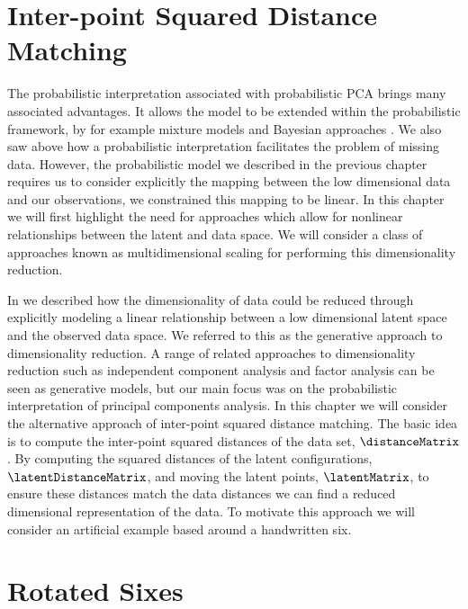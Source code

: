 \section{Inter-point Squared Distance Matching}

The probabilistic interpretation associated with probabilistic
PCA brings many associated
advantages. It allows the model to be extended within the
probabilistic framework, by for example mixture models
\citep{Tipping:iee_mixpca97,Ghahramani:emmixtures97} and Bayesian approaches
\citep{Bishop:bayesPCA98,Bishop:icann99,Minka:automatic01}. We also saw above how a probabilistic interpretation
facilitates the problem of missing data. However, the probabilistic
model we described in the previous chapter requires us to consider
explicitly the mapping between the low dimensional data and our
observations, we constrained this mapping to be linear. In this
chapter we will first highlight the need for approaches which allow
for nonlinear relationships between the latent and data space. We will
consider a class of approaches known as multidimensional
scaling for performing this
dimensionality reduction.

In  we described how the dimensionality of data
could be reduced through explicitly modeling a linear relationship
between a low dimensional latent space and the observed data space. We
referred to this as the generative approach to dimensionality
reduction. A range of related approaches to dimensionality reduction
such as independent component analysis and factor analysis can
be seen as generative models, but our main focus was on the
probabilistic interpretation of principal components
analysis. In this chapter we will
consider the alternative approach of inter-point squared distance
matching. The basic idea is to compute the inter-point squared
distances of the data set, $\distanceMatrix$. By computing the squared
distances of the latent configurations, $\latentDistanceMatrix$, and
moving the latent points, $\latentMatrix$, to ensure these distances
match the data distances we can find a reduced dimensional
representation of the data. To motivate this approach we will consider
an artificial example based around a handwritten six.

\section{Rotated Sixes}\label{sec:roatedSixes}
 


